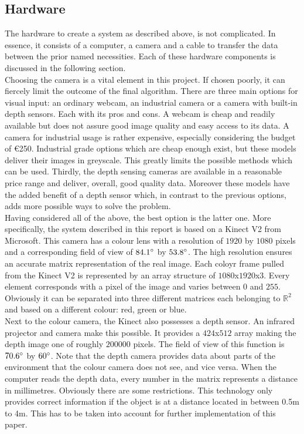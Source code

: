 \documentclass{article}
\begin{document}
\subsection{Hardware}
The hardware to create a system as described above, is not complicated. In essence, it consists of a computer, a camera and a cable to transfer the data between the prior named necessities. Each of these hardware components is discussed in the following section.\\
Choosing the camera is a vital element in this project. If chosen poorly, it can fiercely limit the outcome of the final algorithm. There are three main options for visual input: an ordinary webcam, an industrial camera or a camera with built-in depth sensors. Each with its pros and cons. A webcam is cheap and readily available but does not assure good image quality and easy access to its data. A camera for industrial usage is rather expensive, especially considering the budget of \euro 250. Industrial grade options which are cheap enough exist, but these models deliver their images in greyscale. This greatly limits the possible methods which can be used. Thirdly, the depth sensing cameras are available in a reasonable price range and deliver, overall, good quality data. Moreover these models have the added benefit of a depth sensor which, in contrast to the previous options, adds more possible ways to solve the problem.\\
Having considered all of the above, the best option is the latter one. More specifically, the system described in this report is based on a Kinect V2 from Microsoft. This camera has a colour lens with a resolution of $1920$ by $1080$ pixels and a corresponding field of view of $84.1\degree$ by $53.8\degree$\cite{kinect_specifications}. The high resolution ensures an accurate matrix representation of the real image. Each coloyr frame pulled from the Kinect V2 is represented by an array structure of $1080$x$1920$x$3$. Every element corresponds with a pixel of the image and varies between $0$ and $255$. Obviously it can be separated into three different matrices each belonging to $\mathbb{R}^{2}$ and based on a different colour: red, green or blue.\\ Next to the colour camera, the Kinect also possesses a depth sensor. An infrared projector and camera make this possible\cite{kinect_v2}. It provides a $424$x$512$ array making the depth image one of roughly $200 000$ pixels. The field of view of this function is $70.6\degree$ by $60\degree$. Note that the depth camera provides data about parts of the environment that the colour camera does not see, and vice versa. When the computer reads the depth data, every number in the matrix represents a distance in millimetres. Obviously there are some restrictions. This technology only provides correct information if the object is at a distance located in between 0.5m to 4m. This has to be taken into account for further implementation of this paper.\\
\end{document}
